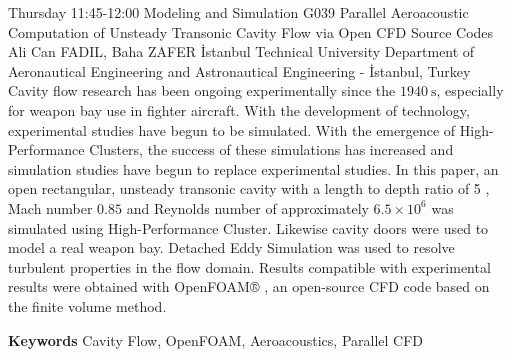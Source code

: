 
    \begin{abstract_basarim}
    {Thursday 11:45-12:00}
    {Modeling and Simulation}
    {G039}
    {Parallel Aeroacoustic Computation of Unsteady Transonic Cavity Flow via Open CFD Source Codes}
    {%
    Ali Can FADIL, Baha ZAFER}
    {%
    }
    {%
    İstanbul Technical University Department of Aeronautical Engineering and Astronautical Engineering - İstanbul, Turkey}
    Cavity flow research has been ongoing experimentally since the $1940 \mathrm{~s}$, especially for weapon bay use in fighter aircraft. With the development of technology, experimental studies have begun to be simulated. With the emergence of High-Performance Clusters, the success of these simulations has increased and simulation studies have begun to replace experimental studies. In this paper, an open rectangular, unsteady transonic cavity with a length to depth ratio of 5 , Mach number $0.85$ and Reynolds number of approximately $6.5 \times 10^{6}$ was simulated using High-Performance Cluster. Likewise cavity doors were used to model a real weapon bay. Detached Eddy Simulation was used to resolve turbulent properties in the flow domain. Results compatible with experimental results were obtained with OpenFOAM® , an open-source CFD code based on the finite volume method. 
    
        \textbf{Keywords} \newline{}Cavity Flow, OpenFOAM, Aeroacoustics, Parallel CFD
    \end{abstract_basarim}
    